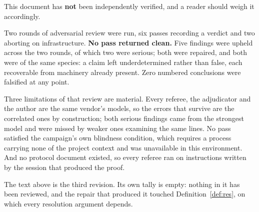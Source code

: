 \documentclass{aicr-solution}
\begin{document}
This document has \textbf{not} been independently verified, and a reader should
weigh it accordingly.

Two rounds of adversarial review were run, six passes recording a verdict and two
aborting on infrastructure. \textbf{No pass returned clean.} Five findings were
upheld across the two rounds, of which two were serious; both were repaired, and
both were of the same species: a claim left underdetermined rather than false,
each recoverable from machinery already present. Zero numbered conclusions were
falsified at any point.

Three limitations of that review are material. Every referee, the adjudicator and
the author are the same vendor's models, so the errors that survive are the
correlated ones by construction; both serious findings came from the strongest
model and were missed by weaker ones examining the same lines. No pass satisfied
the campaign's own blindness condition, which requires a process carrying none of
the project context and was unavailable in this environment. And no protocol
document existed, so every referee ran on instructions written by the session
that produced the proof.

The text above is the third revision. Its own tally is empty: nothing in it has
been reviewed, and the repair that produced it touched
Definition~\ref{def:res}, on which every resolution argument depends.
\end{document}
